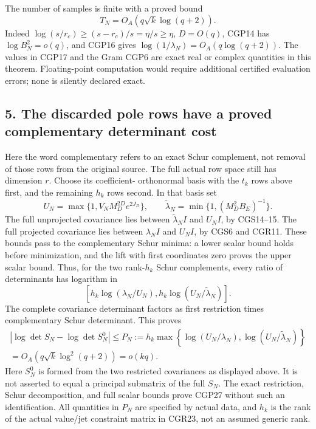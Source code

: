 \documentclass[11pt]{article}
\begin{document}
The number of samples is finite with a proved bound \[
T_N=O_A(q\sqrt k\log(q+2)).
\tag{CGP25}
\] Indeed \(\log(s/r_c)\ge(s-r_c)/s=\eta/s\ge\eta\), \(D=O(q)\), CGP14 has \(\log B_N^2=o(q)\), and CGP16 gives \(\log(1/\lambda_N)=O_A(q\log(q+2))\). The values in CGP17 and the Gram CGP6 are exact real or complex quantities in this theorem. Floating-point computation would require additional certified evaluation errors; none is silently declared exact.

\subsection{5. The discarded pole rows have a proved complementary determinant cost}\label{the-discarded-pole-rows-have-a-proved-complementary-determinant-cost}

Here the word complementary refers to an exact Schur complement, not removal of those rows from the original source. The full actual row space still has dimension \(r\). Choose its coefficient- orthonormal basis with the \(t_k\) rows above first, and the remaining \(h_k\) rows second. In that basis set \[
U_N=\max\{1,V_NM_D^{2D}e^{2J_D}\},\qquad
\widetilde\lambda_N=\min\{1,(M_D^2B_E)^{-1}\}.
\tag{CGP26}
\] The full unprojected covariance lies between \(\widetilde\lambda_N I\) and \(U_NI\), by CGS14--15. The full projected covariance lies between \(\lambda_N I\) and \(U_NI\), by CGS6 and CGR11. These bounds pass to the complementary Schur minima: a lower scalar bound holds before minimization, and the lift with first coordinates zero proves the upper scalar bound. Thus, for the two rank-\(h_k\) Schur complements, every ratio of determinants has logarithm in \[
\left[h_k\log(\lambda_N/U_N),
h_k\log(U_N/\widetilde\lambda_N)\right].
\] The complete covariance determinant factors as first restriction times complementary Schur determinant. This proves \[
\begin{gathered}|\log\det S_N-\log\det S_N^0|
\le P_N:=h_k\max\left\{
\log(U_N/\lambda_N),\log(U_N/\widetilde\lambda_N)\right\}
\\=O_A(q\sqrt k\log^2(q+2))=o(kq).\end{gathered}
\tag{CGP27}
\] Here \(S_N^0\) is formed from the two restricted covariances as displayed above. It is not asserted to equal a principal submatrix of the full \(S_N\). The exact restriction, Schur decomposition, and full scalar bounds prove CGP27 without such an identification. All quantities in \(P_N\) are specified by actual data, and \(h_k\) is the rank of the actual value/jet constraint matrix in CGR23, not an assumed generic rank.
\end{document}
